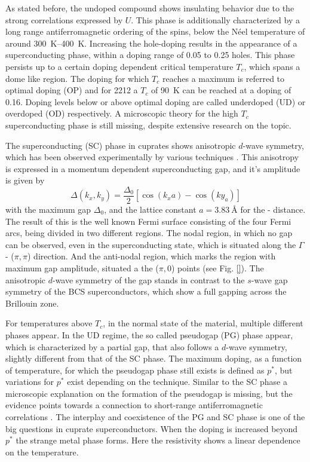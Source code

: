 As stated before, the undoped compound shows insulating behavior due to the strong correlations expressed by $U$.
This phase is additionally characterized by a long range antiferromagnetic ordering of the spins, below the Néel temperature of around \qtyrange{300}{400}{\kelvin}.
Increasing the hole-doping results in the appearance of a superconducting phase, within a doping range of 0.05 to 0.25 holes.
This phase persists up to a certain doping dependent critical temperature $T_c$, which spans a dome like region.
The doping for which $T_c$ reaches a maximum is referred to optimal doping (OP) and for 2212 a $T_c$ of \qty{90}{\kelvin} can be reached at a doping of 0.16.
Doping levels below or above optimal doping are called underdoped (UD) or overdoped (OD) respectively.
A microscopic theory for the high $T_c$ superconducting phase is still missing, despite extensive research on the topic.

The superconducting (SC) phase in cuprates shows anisotropic $d$-wave symmetry, which has been observed experimentally by various techniques \cite{}.
This anisotropy is expressed in a momentum dependent superconducting gap, and it's amplitude is given by
\begin{equation}
	\Delta(k_x,k_y) = \frac{\Delta_0}{2}\left[\cos(k_xa)-\cos(ky_a)\right]
\end{equation}
with the maximum gap $\Delta_0$, and the lattice constant $a=\qty{3.83}{\angstrom}$ for the - distance.
The result of this is the well known Fermi surface consisting of the four Fermi arcs, being divided in two different regions.
The nodal region, in which no gap can be observed, even in the superconducting state, which is situated along the $\Gamma$ - ($\pi, \pi$) direction.
And the anti-nodal region, which marks the region with maximum gap amplitude, situated a the ($\pi, 0$) points (see Fig. \ref{}).
The anisotropic $d$-wave symmetry of the gap stands in contrast to the $s$-wave gap symmetry of the BCS superconductors, which show a full gapping across the Brillouin zone.

For temperatures above $T_c$, in the normal state of the material, multiple different phases appear.
In the UD regime, the so called pseudogap (PG) phase appear, which is characterized by a partial gap, that also follows a $d$-wave symmetry, slightly different from that of the SC phase.
The maximum doping, as a function of temperature, for which the pseudogap phase still exists is defined as $p^*$, but variations for $p^*$ exist depending on the technique.
Similar to the SC phase a microscopic explanation on the formation of the pseudogap is missing, but the evidence points towards a connection to short-range antiferromagnetic correlations \cite{}.
The interplay and coexistence of the PG and SC phase is one of the big questions in cuprate superconductors.
When the doping is increased beyond $p^*$ the strange metal phase forms.
Here the resistivity shows a linear dependence on the temperature.


